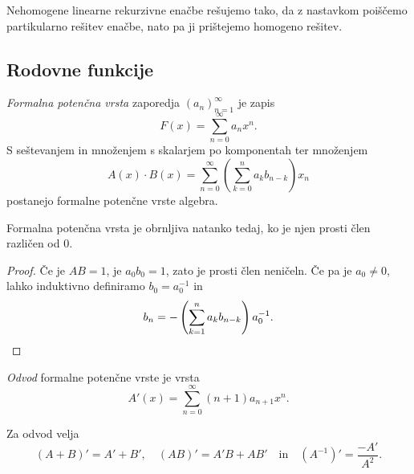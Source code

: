 \begin{opomba}
Nehomogene linearne rekurzivne enačbe rešujemo tako, da z nastavkom
poiščemo partikularno rešitev enačbe, nato pa ji prištejemo
homogeno rešitev.
\end{opomba}

\newpage

\subsection{Rodovne funkcije}


\begin{definicija}
\emph{Formalna potenčna vrsta}
zaporedja $(a_n)_{n=1}^\infty$ je zapis
\[
F(x) = \sum_{n=0}^\infty a_n x^n.
\]
S seštevanjem in množenjem s skalarjem po komponentah ter množenjem
\[
A(x) \cdot B(x) = \sum_{n=0}^\infty
\left(\sum_{k=0}^n a_k b_{n-k}\right) x_n
\]
postanejo formalne potenčne vrste algebra.
\end{definicija}

\begin{trditev}
Formalna potenčna vrsta je obrnljiva natanko tedaj, ko je njen
prosti člen različen od $0$.
\end{trditev}

\begin{proof}
Če je $AB = 1$, je $a_0 b_0 = 1$, zato je prosti člen neničeln.
Če pa je $a_0 \ne 0$, lahko induktivno definiramo $b_0 = a_0^{-1}$
in
\[
b_n = -\left(\sum_{k=1}^n a_k b_{n-k}\right) a_0^{-1}. \qedhere
\]
\end{proof}

\begin{definicija}
\emph{Odvod} formalne potenčne
vrste je vrsta
\[
A'(x) = \sum_{n=0}^\infty (n+1)a_{n+1} x^n.
\]
\end{definicija}

\begin{opomba}
Za odvod velja
\[
(A+B)' = A' + B', \quad (AB)' = A'B+ AB'
\quad \text{in} \quad
(A^{-1})' = \frac{-A'}{A^2}.
\]
\end{opomba}
